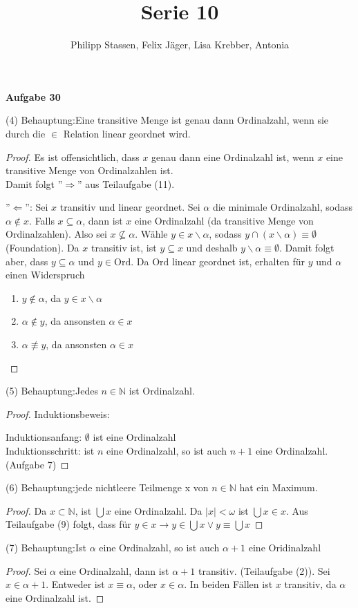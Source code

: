 \documentclass{article}
\title{Serie 10}
\author{Philipp Stassen, Felix Jäger, Lisa Krebber, Antonia}
\newcommand{\claim}{\textsf{Behauptung}:\hspace{0,2cm}}
\theoremstyle{definition}
\theoremstyle{plain}
\theoremstyle{remark}
\newcommand{\aufgabe}[1]{
	{
		\vspace*{0.5cm}
		\textsf{\textbf{Aufgabe #1}}
		\vspace*{0.2cm}

	}
}
\newcommand{\unteraufgabe}[1]{
	{
		\vspace*{0.2cm}
\noindent\textsf{(#1)}
}
}
\newcommand{\induktionsanfang}{
	{
		\vspace*{0.1cm}
		\noindent
		\textsf{Induktionsanfang:}
	}
}
\newcommand{\induktionsschritt}{
	{
		\vspace*{0.1cm}
		\noindent
		\textsf{Induktionsschritt:}
	}
}
\begin{document}
\maketitle
\aufgabe{30}
\unteraufgabe{4} \claim Eine transitive Menge ist genau dann Ordinalzahl, wenn sie durch die $\in$ Relation linear geordnet wird.
\begin{proof} 
	Es ist offensichtlich, dass $x$ genau dann eine Ordinalzahl ist, wenn $x$ eine transitive Menge von Ordinalzahlen ist. \\
	Damit folgt ''$\Longrightarrow$'' aus Teilaufgabe (11).

	\noindent ''$\Longleftarrow$'':
	Sei $x$ transitiv und linear geordnet. Sei $\alpha$ die minimale Ordinalzahl, sodass $\alpha\notin x$. Falls $x\subseteq \alpha$, dann ist $x$ eine Ordinalzahl (da transitive Menge von Ordinalzahlen). Also sei $x\nsubseteq \alpha$. 
	Wähle $y\in x\backslash \alpha$, sodass $y\cap (x\backslash \alpha)\equiv \emptyset$ (Foundation). Da $x$ transitiv ist, ist $y\subseteq x$ und deshalb $y\backslash \alpha \equiv\emptyset$. Damit folgt aber, dass $y\subseteq \alpha$ und $y\in\mathrm{Ord}$. 
	Da $\mathrm{Ord}$ linear geordnet ist, erhalten für $y$ und $\alpha$ einen Widerspruch
	\begin{enumerate}
		\item $y\notin \alpha$, da $y\in x\backslash\alpha$
		\item $\alpha\notin y$, da ansonsten $\alpha\in x$
		\item $\alpha\not\equiv y$, da ansonsten $\alpha\in x$
	\end{enumerate}
\end{proof}
\unteraufgabe5 \claim Jedes $n\in \mathbb{N}$ ist Ordinalzahl. 
\begin{proof}
	Induktionsbeweis:

	\induktionsanfang $\emptyset$ ist eine Ordinalzahl \\
	\induktionsschritt ist $n$ eine Ordinalzahl, so ist auch $n+1$ eine Ordinalzahl. (Aufgabe 7)
\end{proof}
\unteraufgabe6 \claim jede nichtleere Teilmenge x von $n\in\mathbb{N}$ hat ein Maximum.
\begin{proof}
	Da $x\subset\mathbb{N}$, ist $\bigcup x$ eine Ordinalzahl. Da $|x|<\omega$  ist $\bigcup x \in x$. Aus Teilaufgabe (9) folgt, dass für $y\in x \rightarrow y\in \bigcup x\vee y\equiv \bigcup x$
\end{proof}
\unteraufgabe7 \claim Ist $\alpha$ eine Ordinalzahl, so ist auch $\alpha+1$ eine Oridinalzahl
\begin{proof}
	Sei $\alpha$ eine Ordinalzahl, dann ist $\alpha+1$ transitiv. (Teilaufgabe (2)). Sei $x\in \alpha+1$. Entweder ist $x\equiv \alpha$, oder $x\in \alpha$. In beiden Fällen ist $x$ transitiv, da $\alpha$ eine Ordinalzahl ist.
\end{proof}
\end{document}
